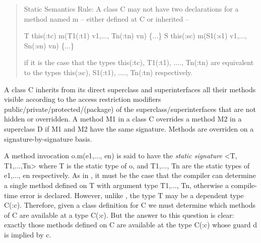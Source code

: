 \begin{quotation}
   {\sc Static Semantics Rule:}
  A class {\cf C} may not have two declarations for a method named {\cf m} -- either
  defined at {\cf C} or inherited --
\begin{x10}
T this(:tc) m(T1(:t1) v1,..., Tn(:tn) vn) \{...\}
S this(:sc) m(S1(:s1) v1,..., Sn(:sn) vn) \{...\}
\end{x10}
\noindent   if it is the case that the types {\cf this(:tc), T1(:t1), ...., Tn(:tn)} are
  equivalent to the types {\cf this(:sc), S1(:t1), ...., Tn(:tn)}
  respectively.
\end{quotation}

A class {\cf C} inherits from its direct superclass and superinterfaces all
their methods visible according to the access restriction modifiers
public/private/protected/(package) of the superclass/superinterfaces
that are not hidden or overridden. A method {\cf M1} in a class {\cf C} overrides
a method {\cf M2} in a superclass {\cf D} if {\cf M1} and {\cf M2} have the same signature.
Methods are overriden on a signature-by-signature basis.

A method invocation {\cf o.m(e1,..., en)} is said to have the {\em static
signature} {\cf <T, T1,...,Tn>} where {\cf T} is the static type of {\cf o}, and
{\cf T1,..., Tn} are the static types of {\cf e1,..., en} respectively.  As in
\Java, it must be the case that the compiler can determine a single
method defined on {\cf T} with argument type {\cf T1,..., Tn}, otherwise a
compile-time error is declared. However, unlike \Java, the \Xten{} type {\cf T}
may be a dependent type {\cf C(:c)}. Therefore, given a class definition for
{\cf C} we must determine which methods of {\cf C} are available at a type
{\cf C(:c)}. But the answer to this question is clear: exactly those methods
defined on {\cf C} are available at the type {\cf C(:c)} whose guard {\cf d} is implied
by {\cf c}.


